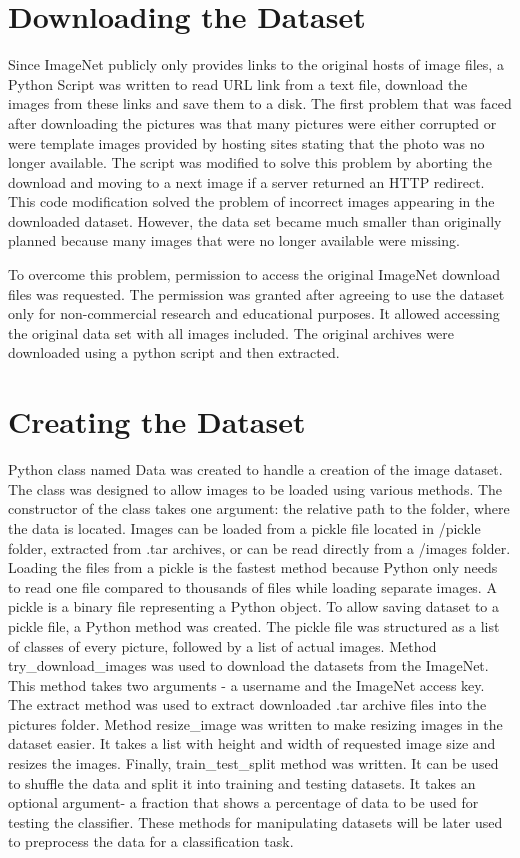 \section {Downloading the Dataset}
Since ImageNet publicly only provides links to the original hosts of image files,  a Python Script was written to read URL link from a text file, download the images from these links and save them to a disk.  The first problem that was faced after downloading the pictures was that many pictures were either corrupted or were template images provided by hosting sites stating that the photo was no longer available. The script was modified to solve this problem by aborting the download and moving to a next image if a server returned an HTTP redirect. This code modification solved the problem of incorrect images appearing in the downloaded dataset. However, the data set became much smaller than originally planned because many images that were no longer available were missing.  

To overcome this problem, permission to access the original ImageNet download files was requested. The permission was granted after agreeing to use the dataset only for non-commercial research and educational purposes. It allowed accessing the original data set with all images included. The original archives were downloaded using a python script and then extracted.

\section {Creating the  Dataset}
Python class named Data was created to handle a creation of the image dataset. The class was designed to allow images to be loaded using various methods. The constructor of the class takes one argument: the relative path to the folder, where the data is located. Images can be loaded from a pickle file located in /pickle folder, extracted from .tar archives, or can be read directly from a /images folder. Loading the files from a pickle is the fastest method because Python only needs to read one file compared to thousands of files while loading separate images.  A pickle is a binary file representing a Python object. To allow saving dataset to a pickle file,  a Python method was created. The pickle file was structured as a list of classes of every picture, followed by a list of actual images. Method try\_download\_images was used to download the datasets from the  ImageNet. This method takes two arguments - a username and the ImageNet access key. The extract method was  used to extract downloaded .tar archive files into the pictures folder. Method resize\_image was written to make  resizing images in the dataset easier. It takes a list with height and width of requested image size and resizes the images.  Finally, train\_test\_split method was written. It can be used to shuffle the data and split it into training and testing datasets. It takes an optional argument- a fraction that shows a percentage of data to be used for testing the classifier. These methods for manipulating datasets will be later used to preprocess the data for a classification task.

